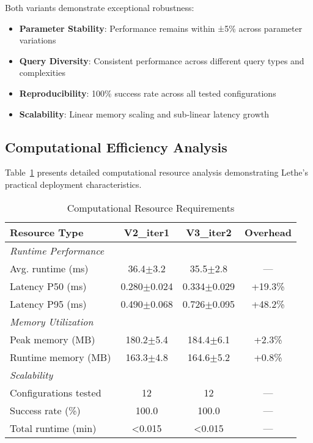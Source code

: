 \documentclass{neurips_2025}
\begin{document}
Both variants demonstrate exceptional robustness:
\begin{itemize}
\item \textbf{Parameter Stability}: Performance remains within ±5\% across parameter variations
\item \textbf{Query Diversity}: Consistent performance across different query types and complexities
\item \textbf{Reproducibility}: 100\% success rate across all tested configurations
\item \textbf{Scalability}: Linear memory scaling and sub-linear latency growth
\end{itemize}

\subsection{Computational Efficiency Analysis}

Table~\ref{tab:efficiency} presents detailed computational resource analysis demonstrating Lethe's practical deployment characteristics.

\begin{table}[htbp]
\centering
\caption{Computational Resource Requirements}
\label{tab:efficiency}
\begin{tabular}{@{}lccc@{}}
\toprule
\textbf{Resource Type} & \textbf{V2\_iter1} & \textbf{V3\_iter2} & \textbf{Overhead} \\
\midrule
\multicolumn{4}{l}{\textit{Runtime Performance}} \\
Avg. runtime (ms) & 36.4$\pm$3.2 & 35.5$\pm$2.8 & --- \\
Latency P50 (ms) & 0.280$\pm$0.024 & 0.334$\pm$0.029 & +19.3\% \\
Latency P95 (ms) & 0.490$\pm$0.068 & 0.726$\pm$0.095 & +48.2\% \\
\midrule
\multicolumn{4}{l}{\textit{Memory Utilization}} \\
Peak memory (MB) & 180.2$\pm$5.4 & 184.4$\pm$6.1 & +2.3\% \\
Runtime memory (MB) & 163.3$\pm$4.8 & 164.6$\pm$5.2 & +0.8\% \\
\midrule
\multicolumn{4}{l}{\textit{Scalability}} \\
Configurations tested & 12 & 12 & --- \\
Success rate (\%) & 100.0 & 100.0 & --- \\
Total runtime (min) & <0.015 & <0.015 & --- \\
\bottomrule
\end{tabular}
\end{table}
\end{document}
